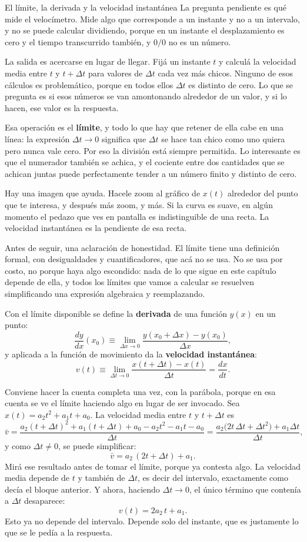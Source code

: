 \documentclass[11pt,openany]{book}
\begin{document}
\begin{bloque}{El límite, la derivada y la velocidad instantánea}
La pregunta pendiente es qué mide el velocímetro. Mide algo que corresponde a un instante y no a un intervalo, y no se puede calcular dividiendo, porque en un instante el desplazamiento es cero y el tiempo transcurrido también, y $0/0$ no es un número.

La salida es acercarse en lugar de llegar. Fijá un instante $t$ y calculá la velocidad media entre $t$ y $t+\Delta t$ para valores de $\Delta t$ cada vez más chicos. Ninguno de esos cálculos es problemático, porque en todos ellos $\Delta t$ es distinto de cero. Lo que se pregunta es si esos números se van amontonando alrededor de un valor, y si lo hacen, ese valor es la respuesta.

Esa operación es el \textbf{límite}, y todo lo que hay que retener de ella cabe en una línea: la expresión $\Delta t \to 0$ significa que $\Delta t$ se hace tan chico como uno quiera pero nunca vale cero. Por eso la división está siempre permitida. Lo interesante es que el numerador también se achica, y el cociente entre dos cantidades que se achican juntas puede perfectamente tender a un número finito y distinto de cero.

Hay una imagen que ayuda. Hacele zoom al gráfico de $x(t)$ alrededor del punto que te interesa, y después más zoom, y más. Si la curva es suave, en algún momento el pedazo que ves en pantalla es indistinguible de una recta. La velocidad instantánea es la pendiente de esa recta.

Antes de seguir, una aclaración de honestidad. El límite tiene una definición formal, con desigualdades y cuantificadores, que acá no se usa. No se usa por costo, no porque haya algo escondido: nada de lo que sigue en este capítulo depende de ella, y todos los límites que vamos a calcular se resuelven simplificando una expresión algebraica y reemplazando.

Con el límite disponible se define la \textbf{derivada} de una función $y(x)$ en un punto:
\[
\frac{dy}{dx}(x_0) \equiv \lim_{\Delta x\to 0}\frac{y(x_0+\Delta x)-y(x_0)}{\Delta x},
\]
y aplicada a la función de movimiento da la \textbf{velocidad instantánea}:
\[
v(t) \equiv \lim_{\Delta t\to 0}\frac{x(t+\Delta t)-x(t)}{\Delta t} = \frac{dx}{dt}.
\]

Conviene hacer la cuenta completa una vez, con la parábola, porque en esa cuenta se ve el límite haciendo algo en lugar de ser invocado. Sea $x(t) = a_2t^2 + a_1t + a_0$. La velocidad media entre $t$ y $t+\Delta t$ es
\[
\bar v = \frac{a_2(t+\Delta t)^2 + a_1(t+\Delta t) + a_0 - a_2t^2 - a_1t - a_0}{\Delta t}
= \frac{a_2\big(2t\,\Delta t + \Delta t^2\big) + a_1\Delta t}{\Delta t},
\]
y como $\Delta t \neq 0$, se puede simplificar:
\[
\bar v = a_2\,(2t + \Delta t) + a_1.
\]
Mirá ese resultado antes de tomar el límite, porque ya contesta algo. La velocidad media depende de $t$ y también de $\Delta t$, es decir del intervalo, exactamente como decía el bloque anterior. Y ahora, haciendo $\Delta t \to 0$, el único término que contenía a $\Delta t$ desaparece:
\[
v(t) = 2a_2\,t + a_1.
\]
Esto ya no depende del intervalo. Depende solo del instante, que es justamente lo que se le pedía a la respuesta.


\end{bloque}
\end{document}

